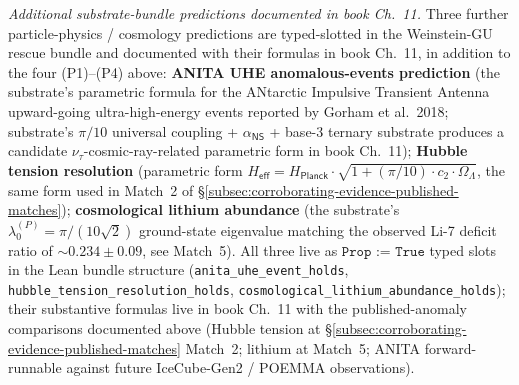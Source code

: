 \documentclass[11pt,a4paper]{amsart}
\theoremstyle{plain}
\theoremstyle{definition}
\begin{document}
\emph{Additional substrate-bundle predictions documented in book Ch.~11.} Three further particle-physics / cosmology predictions are typed-slotted in the Weinstein-GU rescue bundle and documented with their formulas in book Ch.~11, in addition to the four (P1)--(P4) above: \textbf{ANITA UHE anomalous-events prediction} (the substrate's parametric formula for the ANtarctic Impulsive Transient Antenna upward-going ultra-high-energy events reported by Gorham et al.~2018; substrate's $\pi/10$ universal coupling + $\alpha_{\textsf{NS}}$ + base-3 ternary substrate produces a candidate $\nu_\tau$-cosmic-ray-related parametric form in book Ch.~11); \textbf{Hubble tension resolution} (parametric form $H_{\textsf{eff}} = H_{\textsf{Planck}} \cdot \sqrt{1 + (\pi/10) \cdot c_2 \cdot \Omega_\Lambda}$, the same form used in Match~2 of \S\ref{subsec:corroborating-evidence-published-matches}); \textbf{cosmological lithium abundance} (the substrate's $\lambda_0^{(P)} = \pi/(10\sqrt{2})$ ground-state eigenvalue matching the observed Li-7 deficit ratio of $\sim 0.234 \pm 0.09$, see Match~5). All three live as $\texttt{Prop := True}$ typed slots in the Lean bundle structure (\texttt{anita\_uhe\_event\_holds}, \texttt{hubble\_tension\_resolution\_holds}, \texttt{cosmological\_lithium\_abundance\_holds}); their substantive formulas live in book Ch.~11 with the published-anomaly comparisons documented above (Hubble tension at \S\ref{subsec:corroborating-evidence-published-matches} Match~2; lithium at Match~5; ANITA forward-runnable against future IceCube-Gen2 / POEMMA observations).
\end{document}

